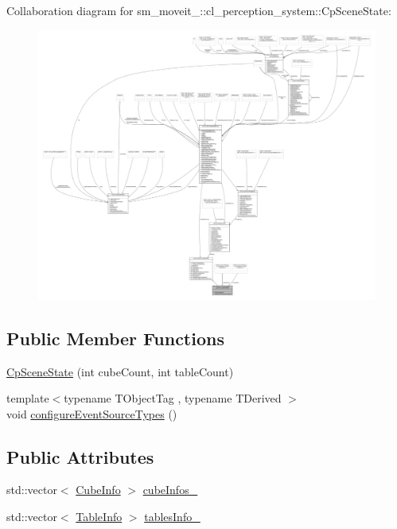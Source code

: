 Collaboration diagram for sm\+\_\+moveit\+\_\+:\+:cl\+\_\+perception\+\_\+system\+:\+:Cp\+Scene\+State\+:
\nopagebreak
\begin{figure}[H]
\begin{center}
\leavevmode
\includegraphics[width=350pt]{classsm__moveit__4_1_1cl__perception__system_1_1CpSceneState__coll__graph}
\end{center}
\end{figure}
\subsection*{Public Member Functions}
\begin{DoxyCompactItemize}
\item 
\hyperlink{classsm__moveit__4_1_1cl__perception__system_1_1CpSceneState_a276c80729d5fb92a3d6a7805c55d3f04}{Cp\+Scene\+State} (int cube\+Count, int table\+Count)
\item 
{\footnotesize template$<$typename T\+Object\+Tag , typename T\+Derived $>$ }\\void \hyperlink{classsm__moveit__4_1_1cl__perception__system_1_1CpSceneState_a9b0e2ac64f73d6f848c87b476c6a927d}{configure\+Event\+Source\+Types} ()
\end{DoxyCompactItemize}
\subsection*{Public Attributes}
\begin{DoxyCompactItemize}
\item 
std\+::vector$<$ \hyperlink{structsm__moveit__4_1_1cl__perception__system_1_1CubeInfo}{Cube\+Info} $>$ \hyperlink{classsm__moveit__4_1_1cl__perception__system_1_1CpSceneState_a734a45934cccf19ac5c886cd94bc8cda}{cube\+Infos\+\_\+}
\item 
std\+::vector$<$ \hyperlink{structsm__moveit__4_1_1cl__perception__system_1_1TableInfo}{Table\+Info} $>$ \hyperlink{classsm__moveit__4_1_1cl__perception__system_1_1CpSceneState_a95f74dd16566d97e017650ccdf4b8a46}{tables\+Info\+\_\+}
\end{DoxyCompactItemize}
